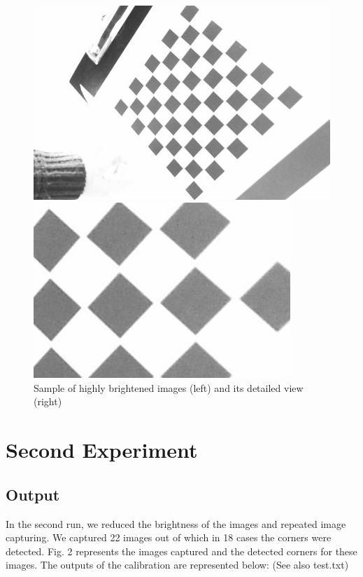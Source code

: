 \documentclass{scrartcl}
\begin{document}
\begin{figure}[H]
\centering
\begin{minipage}{.5\textwidth}
  \centering
  \includegraphics[width=.8\linewidth]{img/brightness.jpg}
\end{minipage}%
\begin{minipage}{.5\textwidth}
  \centering
  \includegraphics[width=.8\linewidth]{img/bright_detail.jpg}
\end{minipage}
\caption{Sample of highly brightened images (left) and its detailed view (right)}
\label{fig:brightness}
\end{figure}



\section{Second Experiment}

\subsection{Output}

In the second run, we reduced the brightness of the images and repeated image capturing. We captured 22 images out of which in 18 cases the corners were detected. Fig. 2 represents the images captured and the detected corners for these images. The outputs of the calibration are represented below: (See also test.txt)\\
 
\end{document}
